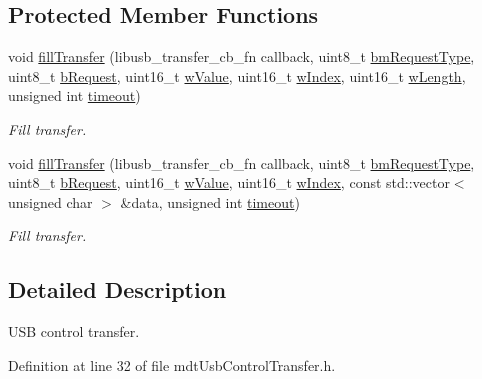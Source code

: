 \subsection*{Protected Member Functions}
\begin{DoxyCompactItemize}
\item 
void \hyperlink{classmdt_usb_control_transfer_abe100958d6d455c89b24b68e4e94a9b1}{fill\-Transfer} (libusb\-\_\-transfer\-\_\-cb\-\_\-fn callback, uint8\-\_\-t \hyperlink{classmdt_usb_control_transfer_adedb82c8d1719e1c618e682f14759a56}{bm\-Request\-Type}, uint8\-\_\-t \hyperlink{classmdt_usb_control_transfer_acad163ec6dd2f3172b844115fb0bbfb9}{b\-Request}, uint16\-\_\-t \hyperlink{classmdt_usb_control_transfer_aba33b977514458a3413a2fe12fe3b5c8}{w\-Value}, uint16\-\_\-t \hyperlink{classmdt_usb_control_transfer_af27548b7789b53a6bac3051ffca018a9}{w\-Index}, uint16\-\_\-t \hyperlink{classmdt_usb_control_transfer_a673c61f2bead515c3f11f588bb203e03}{w\-Length}, unsigned int \hyperlink{classmdt_usb_transfer_a3262511f6062348132e7ee689c24226c}{timeout})
\begin{DoxyCompactList}\small\item\em Fill transfer. \end{DoxyCompactList}\item 
void \hyperlink{classmdt_usb_control_transfer_a57d308b969f1b542085b64788d48a9fa}{fill\-Transfer} (libusb\-\_\-transfer\-\_\-cb\-\_\-fn callback, uint8\-\_\-t \hyperlink{classmdt_usb_control_transfer_adedb82c8d1719e1c618e682f14759a56}{bm\-Request\-Type}, uint8\-\_\-t \hyperlink{classmdt_usb_control_transfer_acad163ec6dd2f3172b844115fb0bbfb9}{b\-Request}, uint16\-\_\-t \hyperlink{classmdt_usb_control_transfer_aba33b977514458a3413a2fe12fe3b5c8}{w\-Value}, uint16\-\_\-t \hyperlink{classmdt_usb_control_transfer_af27548b7789b53a6bac3051ffca018a9}{w\-Index}, const std\-::vector$<$ unsigned char $>$ \&data, unsigned int \hyperlink{classmdt_usb_transfer_a3262511f6062348132e7ee689c24226c}{timeout})
\begin{DoxyCompactList}\small\item\em Fill transfer. \end{DoxyCompactList}\end{DoxyCompactItemize}


\subsection{Detailed Description}
U\-S\-B control transfer. 

Definition at line 32 of file mdt\-Usb\-Control\-Transfer.\-h.




